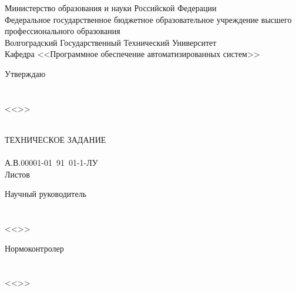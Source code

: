 {{
\sloppy
\clearpage
\thispagestyle{empty}
\begin{center}
Министерство образования и науки Российской Федерации\\
Федеральное государственное бюджетное образовательное учреждение высшего профессионального образования\\
Волгоградский Государственный Технический Университет\\
Кафедра <<Программное обеспечение автоматизированных систем>>\\
\end{center}
\vfill
\hfill
\begin{minipage}[c]{18em}
Утверждаю\\
\VSTUHeadOfDepartmentPost\\
\makebox[2cm]{\hrulefill}\VSTUHeadOfDepartmentDegree~\VSTUHeadOfDepartmentName\\
<<\makebox[1.5cm]{\hrulefill}>>\makebox[3.5cm]{\hrulefill}\the\year
\end{minipage}
\vspace{8mm}
\begin{center}
\VSTUTitle\\
\vspace{8mm}
ТЕХНИЧЕСКОЕ ЗАДАНИЕ\\
\VSTUDocumentCode{}\\
А.В.00001-01\ 91\ 01-1-ЛУ\\
Листов \totalpages\\
\vfill
\end{center}
\begin{flushright}
\begin{minipage}[c]{15em}
Научный руководитель\\
\VSTUDirectorDegree{}\\
\makebox[2cm]{\hrulefill}\VSTUDirectorName\\
<<\makebox[1.5cm]{\hrulefill}>>\makebox[3.5cm]{\hrulefill}\the\year
\end{minipage}
\end{flushright}
\vspace{8mm}
\begin{flushleft}
\begin{minipage}[c]{15em}
Нормоконтролер\\
\VSTUStandardsAdviserDegree\\
\makebox[2cm]{\hrulefill}\VSTUStandardsAdviserName\\
<<\makebox[1.5cm]{\hrulefill}>>\makebox[3.5cm]{\hrulefill}\the\year
\end{minipage}

\end{flushleft}}}
